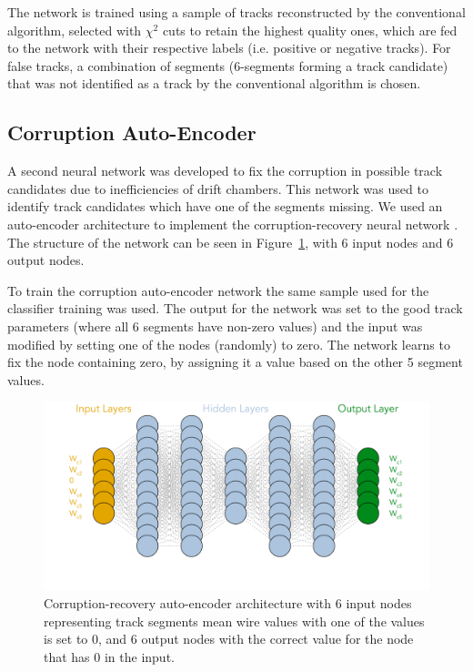 \documentclass[aps,prl,preprint,12pt]{elsarticle}
\begin{document}
The network is trained using a sample of tracks reconstructed by the conventional algorithm, selected with 
$\chi^2$ cuts to retain the highest quality ones, which are fed to the network with their respective labels 
(i.e. positive or negative tracks). For false tracks, a combination of segments (6-segments forming a track 
candidate) that was not identified as a track by the conventional algorithm is chosen.
 
 \subsection{Corruption Auto-Encoder}
 
A second neural network was developed to fix the corruption in possible track candidates due to 
inefficiencies of drift chambers. This network was used to identify track candidates which have one of 
the segments missing. We used an auto-encoder architecture to implement the corruption-recovery 
neural network \cite{Gavalian:2020xmc}. The structure of the network can be seen in 
Figure~\ref{autoencoder:architecture}, with 6 input nodes and 6 output nodes.

To train the corruption auto-encoder network the same sample used for the classifier training was used.
The output for the network was set to the good track parameters (where all 6 segments have non-zero values) 
and the input was modified by setting one of the nodes (randomly) to zero. The network learns to fix the node 
containing zero, by assigning it a value based on the other 5 segment values. 

 \begin{figure}[!ht]
\begin{center}

\includegraphics[width=4.5in]{images/aue_diagram.pdf}
\caption {Corruption-recovery auto-encoder architecture with 6 input nodes representing track segments 
mean wire values with one of the values is set to 0, and 6 output nodes with the correct value for the node 
that has 0 in the input. }
 \label{autoencoder:architecture}
 \end{center}
\end{figure}
\end{document}
